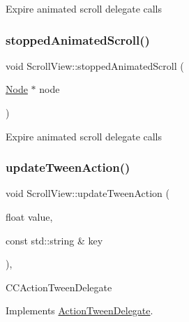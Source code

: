 Expire animated scroll delegate calls \mbox{\label{classScrollView_a63f5487af2b0ff9b8a58dcb3921c9026}} 
\subsubsection{\texorpdfstring{stopped\+Animated\+Scroll()}{stoppedAnimatedScroll()}\hspace{0.1cm}{\footnotesize\ttfamily [2/2]}}
{\footnotesize\ttfamily void Scroll\+View\+::stopped\+Animated\+Scroll (\begin{DoxyParamCaption}\item[{\hyperlink{classNode}{Node} $\ast$}]{node }\end{DoxyParamCaption})\hspace{0.3cm}{\ttfamily [protected]}}

Expire animated scroll delegate calls \mbox{\label{classScrollView_a0af7498e959826dad2ae4d66f1b5b71d}} 
\subsubsection{\texorpdfstring{update\+Tween\+Action()}{updateTweenAction()}\hspace{0.1cm}{\footnotesize\ttfamily [1/2]}}
{\footnotesize\ttfamily void Scroll\+View\+::update\+Tween\+Action (\begin{DoxyParamCaption}\item[{float}]{value,  }\item[{const std\+::string \&}]{key }\end{DoxyParamCaption})\hspace{0.3cm}{\ttfamily [override]}, {\ttfamily [virtual]}}

C\+C\+Action\+Tween\+Delegate 

Implements \hyperlink{classActionTweenDelegate_a6cb6dce375e29bd38af1a81001eeac66}{Action\+Tween\+Delegate}.

\mbox{\label{classScrollView_a0af7498e959826dad2ae4d66f1b5b71d}} 
